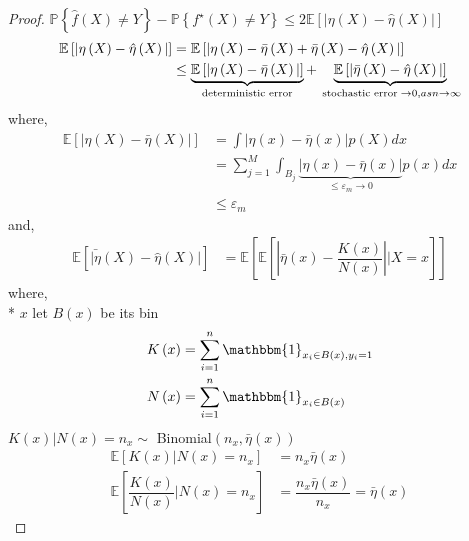 \documentclass{article}
\begin{document}
\begin{proof} \label{proof:ehc} 
$\mathbb{P}\left\{\hat{f}\left(X\right) \neq  Y\right\} - \mathbb{P}\left\{f^\star \left(X\right) \neq  Y\right\} \leq  2 \mathbb{E}\left[|\eta\left(X\right) - \hat{\eta}\left(X\right)|\right]$
\begin{align*}
\mathbb{E}\left[| \eta\left(X\right) - \hat{\eta}\left(X\right) |\right] &= \mathbb{E}\left[|\eta\left(X\right) - \bar{\eta}\left(X\right) + \bar{\eta}\left(X\right) - \hat{\eta}\left(X\right)|\right]
\\ &\leq  \underbrace{\mathbb{E}\left[|\eta\left(X\right) - \bar{\eta}\left(X\right)|\right]}_{\text{\;deterministic error\;}} + \underbrace{\mathbb{E}\left[| \bar{\eta}\left(X\right) - \hat{\eta}\left(X\right) |\right]}_{\text{\;stochastic error\;} \to  0, as n \to  \infty}
\end{align*}
where,
\begin{align*}
\mathbb{E}\left[|\eta\left(X\right) - \bar{\eta}\left(X\right)|\right] &= \displaystyle\int |\eta\left(x\right) - \bar{\eta}\left(x\right)| p\left(X\right) dx
\\ &= \displaystyle\sum_{j=1}^{M} \displaystyle\int_{B_{j}} \underbrace{|\eta\left(x\right) - \bar{\eta}\left(x\right)|}_{\leq  \varepsilon_{m} \to  0} p\left(x\right) dx
\\ &\leq  \varepsilon_{m}
\end{align*}
and,
\begin{align*}
\mathbb{E}\left[\bar{|\eta}\left(X\right) - \hat{\eta}\left(X\right)|\right] &= \mathbb{E}\left[\mathbb{E}\left[| \bar{\eta}\left(x\right) - \dfrac{K\left(x\right)}{N\left(x\right)} | | X = x \right]\right]
\end{align*}
where,
\\* $x $ let $B\left(x\right) $ be its bin
\begin{align*}
K\left(x\right)  &= \displaystyle\sum_{i=1}^{n} \mathbbm{1}_{x_{i} \in B\left(x\right), y_{i} = 1}
\\ N\left(x\right)  &= \displaystyle\sum_{i=1}^{n} \mathbbm{1}_{x_{i} \in B\left(x\right)}
\end{align*}
$K\left(x\right)  | N\left(x\right) = n_{x} \sim $ Binomial$\left(n_{x}, \bar{\eta}\left(x\right)\right)$
\begin{align*}
\mathbb{E}\left[K\left(x\right) | N\left(x\right) = n_{x}\right] &= n_{x} \bar{\eta}\left(x\right)
\\ \mathbb{E}\left[\dfrac{K\left(x\right)}{N\left(x\right)} | N\left(x\right) = n_{x}\right] &= \dfrac{n_{x} \bar{\eta}\left(x\right)}{n_{x}} = \bar{\eta}\left(x\right)

\end{align*}
\end{proof}
\end{document}
